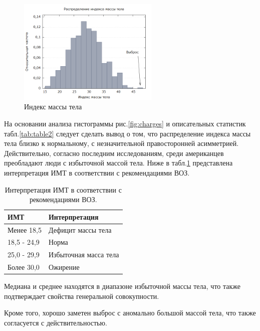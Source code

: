 \documentclass[a4paper,12pt]{article}
\begin{document}
\begin{figure}[H]
	\includegraphics[width=0.6\textwidth]{../[graphics]/bmi.png}
	\centering
	\caption{Индекс массы тела}
	\label{fig:bmi}
\end{figure}

На основании анализа гистограммы рис.\ref{fig:charges} и описательных статистик табл.\ref{tab:table2} следует сделать вывод о том, что распределение индекса массы тела близко к нормальному, с незначительной правосторонней асимметрией. Действительно, согласно последним исследованиям, среди американцев преобладают люди с избыточной массой тела. Ниже в табл.\ref{tab:bmi} представлена интерпретация ИМТ в соответствии с рекомендациями ВОЗ.

\begin{table}[H]
	\begin{center}
		\begin{tabular}{ | l | l |}
			\hline
			ИМТ & Интерпретация \\ \hline
			Менее 18,5 & Дефицит массы тела \\ \hline
			18,5 - 24,9 & Норма \\ \hline
			25,0 - 29,9 & Избыточная масса тела \\ \hline
			Более 30,0 & Ожирение \\ \hline
		\end{tabular}
	\end{center}
	\caption{Интерпретация ИМТ в соответствии с рекомендациями ВОЗ.}
	\label{tab:bmi}
\end{table}

Медиана и среднее находятся в диапазоне избыточной массы тела, что также подтверждает свойства генеральной совокупности.

Кроме того, хорошо заметен выброс с аномально большой массой тела, что также согласуется с действительностью.
\end{document}
